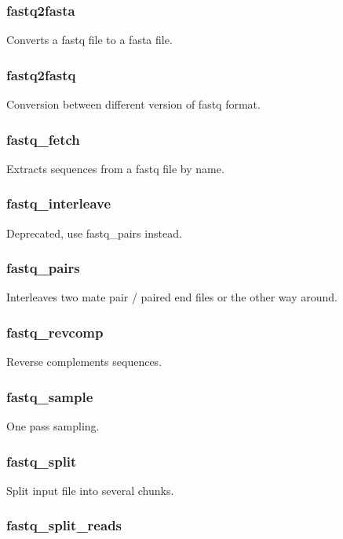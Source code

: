 \documentclass[a4paper,12pt]{article}
\begin{document}
\subsubsection{fastq2fasta}

Converts a fastq file to a fasta file.

\subsubsection{fastq2fastq}

Conversion between different version of fastq format.

\subsubsection{fastq\_fetch}

Extracts sequences from a fastq file by name.

\subsubsection{fastq\_interleave}

Deprecated, use fastq\_pairs instead.

\subsubsection{fastq\_pairs}

Interleaves two mate pair / paired end files or the other way around.

\subsubsection{fastq\_revcomp}

Reverse complements sequences.

\subsubsection{fastq\_sample}

One pass sampling.

\subsubsection{fastq\_split}

Split input file into several chunks.

\subsubsection{fastq\_split\_reads}
\end{document}
